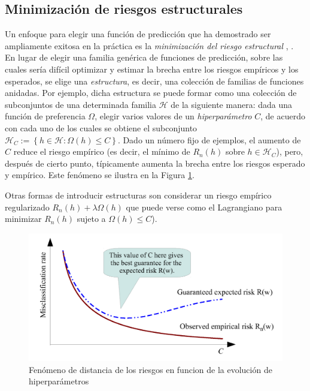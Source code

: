 \subsection{Minimizaci\'on de riesgos estructurales}

Un enfoque para elegir una funci\'on de predicci\'on que ha demostrado ser ampliamente exitosa en la pr\'actica es la \textit{minimizaci\'on del riesgo estructural} \cite{vapnik:1974}, \cite{vapnik:1998}. En lugar de elegir una familia gen\'erica de funciones de predicci\'on, sobre las cuales ser\'ia dif\'icil optimizar y estimar la brecha entre los riesgos emp\'iricos y los esperados, se elige una \textit{estructura}, es decir, una colecci\'on de familias de funciones anidadas. Por ejemplo, dicha estructura se puede formar como una colecci\'on de subconjuntos de una determinada familia $\mathcal{H}$ de la siguiente manera: dada una funci\'on de preferencia $\Omega$, elegir varios valores de un \textit{hiperpar\'ametro} $C$, de acuerdo con cada uno de los cuales se obtiene el subconjunto $\mathcal{H}_C := \left\lbrace h \in \mathcal{H} : \Omega (h) \leq C \right\rbrace$. Dado un n\'umero fijo de ejemplos, el aumento de $C$ reduce el riesgo emp\'irico (es decir, el m\'inimo de $R_n (h) $ sobre $h \in \mathcal{H}_C$), pero, despu\'es de cierto punto, t\'ipicamente aumenta la brecha entre los riesgos esperado y emp\'irico. Este fen\'omeno se ilustra en la Figura \ref{gfx: hiperparametros}.


Otras formas de introducir estructuras son considerar un riesgo emp\'irico regularizado $R_n (h) + \lambda \Omega (h)$  que puede verse como el Lagrangiano para minimizar $R_n (h)$ sujeto a $\Omega (h) \leq C$).

\begin{figure}[h]
	\label{gfx: hiperparametros}
	\centering
	\includegraphics[scale=.3]{gfx/hyperparametros.png}
	\caption{Fen\'omeno de distancia de los riesgos en funcion de la evoluci\'on de hiperpar\'ametros}
\end{figure}

